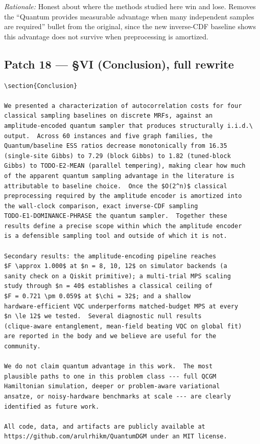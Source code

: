 \noindent\emph{Rationale:} Honest about where the methods studied here win
and lose.  Removes the ``Quantum provides measurable advantage when many
independent samples are required'' bullet from the original, since the new
inverse-CDF baseline shows this advantage does not survive when
preprocessing is amortized.

\subsection*{Patch 18 --- \S VI (Conclusion), full rewrite}

\begin{verbatim}
\section{Conclusion}

We presented a characterization of autocorrelation costs for four
classical sampling baselines on discrete MRFs, against an
amplitude-encoded quantum sampler that produces structurally i.i.d.\
output.  Across 60 instances and five graph families, the
Quantum/baseline ESS ratios decrease monotonically from 16.35
(single-site Gibbs) to 7.29 (block Gibbs) to 1.82 (tuned-block
Gibbs) to TODO-E2-MEAN (parallel tempering), making clear how much
of the apparent quantum sampling advantage in the literature is
attributable to baseline choice.  Once the $O(2^n)$ classical
preprocessing required by the amplitude encoder is amortized into
the wall-clock comparison, exact inverse-CDF sampling
TODO-E1-DOMINANCE-PHRASE the quantum sampler.  Together these
results define a precise scope within which the amplitude encoder
is a defensible sampling tool and outside of which it is not.

Secondary results: the amplitude-encoding pipeline reaches
$F \approx 1.000$ at $n = 8, 10, 12$ on simulator backends (a
sanity check on a Qiskit primitive); a multi-trial MPS scaling
study through $n = 40$ establishes a classical ceiling of
$F = 0.721 \pm 0.059$ at $\chi = 32$; and a shallow
hardware-efficient VQC underperforms matched-budget MPS at every
$n \le 12$ we tested.  Several diagnostic null results
(clique-aware entanglement, mean-field beating VQC on global fit)
are reported in the body and we believe are useful for the
community.

We do not claim quantum advantage in this work.  The most
plausible paths to one in this problem class --- full QCGM
Hamiltonian simulation, deeper or problem-aware variational
ansatze, or noisy-hardware benchmarks at scale --- are clearly
identified as future work.

All code, data, and artifacts are publicly available at
https://github.com/arulrhikm/QuantumDGM under an MIT license.
\end{verbatim}

